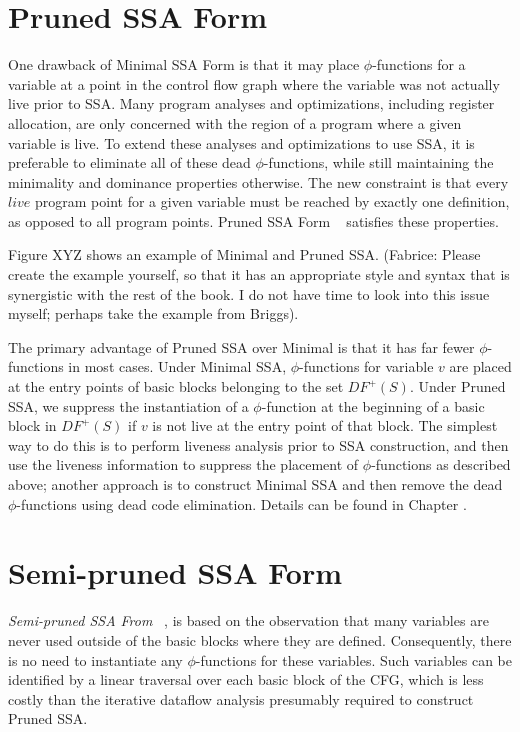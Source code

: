 \section{Pruned SSA Form}
\label{sec-prop-pruned}

One drawback of Minimal SSA Form is that it may place $\phi$-functions
for a variable at a point in the control flow graph where the variable was
not actually live prior to SSA. Many program analyses and optimizations,
including register allocation, are only concerned with the region of a 
program where a given variable is live. To extend these analyses and
optimizations to use SSA, it is preferable to eliminate all
of these dead $\phi$-functions, while still maintaining the minimality
and dominance properties otherwise. The new constraint is that every
$live$ program point for a given variable must be reached by exactly one
definition, as opposed to all program points.  Pruned SSA Form
~\cite{ChoiJan91} satisfies these properties. 

Figure XYZ shows an example of Minimal and Pruned SSA. 
(Fabrice: Please create the example yourself, so that it has an appropriate
style and syntax that is synergistic with the rest of the book. I do not have
time to look into this issue myself; perhaps take the example from Briggs). 

The primary advantage of Pruned SSA over Minimal is that it has far
fewer $\phi$-functions in most cases. 
Under Minimal SSA, $\phi$-functions for variable $v$ are placed at
the entry points of basic blocks belonging to the set $DF^{+}(S)$. 
Under Pruned SSA, we suppress the instantiation of a $\phi$-function
at the beginning of a basic block in $DF^{+}(S)$ if $v$ is not live
at the entry point of that block. The simplest way to do this is to
perform liveness analysis prior to SSA construction, and then
use the liveness information to suppress the placement of $\phi$-functions
as described above; another approach is to construct Minimal SSA
and then remove the dead $\phi$-functions using dead code
elimination. Details can be found in Chapter 
\label{chap:classical_construction}.


\section{Semi-pruned SSA Form}

\emph{Semi-pruned SSA From} ~\cite{BriggsJul98}, 
is based on the observation that
many variables are never used outside of the basic blocks
where they are defined. Consequently, there is no need 
to instantiate any $\phi$-functions for these variables.
Such variables can be identified by a linear traversal
over each basic block of the CFG, which is less costly
than the iterative dataflow analysis presumably required
to construct Pruned SSA. 
 

